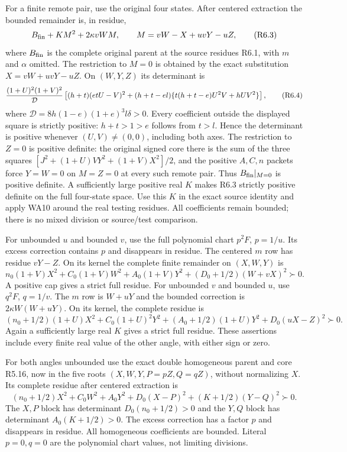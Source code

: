 For a finite remote pair, use the original four states. After centered
extraction the bounded remainder is, in residue,
\[
 B_{\rm fin}+K M^2+2\kappa vWM,\qquad
 M=vW-X+uvY-uZ,                                      \tag{R6.3}
\]
where $B_{\rm fin}$ is the complete original parent at the source
residues R6.1, with $m$ and $\alpha$ omitted. The restriction to
$M=0$ is obtained by the exact substitution $X=vW+uvY-uZ$.
On $(W,Y,Z)$ its determinant is
\[
 { (1+U)^2(1+V)^2\over\mathcal D}
 \left[(h+t)(etU-V)^2+(h+t-el)
          \{t(h+t-e)U^2V+hUV^2\}\right],             \tag{R6.4}
\]
where $\mathcal D=8h(1-e)(1+e)^3l\delta>0$.
Every coefficient outside the displayed square is strictly positive:
$h+t>1>e$ follows from $t>l$. Hence the determinant is positive
whenever $(U,V)\ne(0,0)$, including both axes. The restriction to
$Z=0$ is positive definite: the original signed core there is the sum
of the three squares
$[J^2+(1+U)VY^2+(1+V)X^2]/2$, and the positive $A,C,n$ packets
force $Y=W=0$ on $M=Z=0$ at every such remote pair.
Thus $B_{\rm fin}|_{M=0}$ is positive definite. A sufficiently large
positive real $K$ makes R6.3 strictly positive definite on the full
four-state space. Use this $K$ in the exact source identity and apply
WA10 around the real testing residues. All coefficients remain bounded;
there is no mixed division or source/test comparison.

For unbounded $u$ and bounded $v$, use the full polynomial chart
$p^2F$, $p=1/u$. Its excess correction contains $p$ and disappears in
residue. The centered $m$ row has residue $vY-Z$. On its kernel the
complete finite remainder on $(X,W,Y)$ is
\[
 n_0(1+V)X^2+C_0(1+V)W^2+A_0(1+V)Y^2
                                      +(D_0+1/2)(W+vX)^2\succ0.\tag{R6.5}
\]
A positive cap gives a strict full residue. For unbounded $v$ and bounded
$u$, use $q^2F$, $q=1/v$. The $m$ row is $W+uY$ and the bounded
correction is $2\kappa W(W+uY)$. On its kernel, the complete residue is
\[
 (n_0+1/2)(1+U)X^2+C_0(1+U)^2Y^2
             +(A_0+1/2)(1+U)Y^2+D_0(uX-Z)^2\succ0.  \tag{R6.6}
\]
Again a sufficiently large real $K$ gives a strict full residue.
These assertions include every finite real value of the other angle,
with either sign or zero.

For both angles unbounded use the exact double homogeneous parent and
core R5.16, now in the five roots $(X,W,Y,P=pZ,Q=qZ)$, without normalizing
$X$. Its complete residue after centered extraction is
\[
 (n_0+1/2)X^2+C_0W^2+A_0Y^2+D_0(X-P)^2
                                  +(K+1/2)(Y-Q)^2\succ0.        \tag{R6.7}
\]
The $X,P$ block has determinant $D_0(n_0+1/2)>0$ and the $Y,Q$ block
has determinant $A_0(K+1/2)>0$. The excess correction has a factor $p$
and disappears in residue. All homogeneous coefficients are bounded.
Literal $p=0,q=0$ are the polynomial chart values, not limiting divisions.


